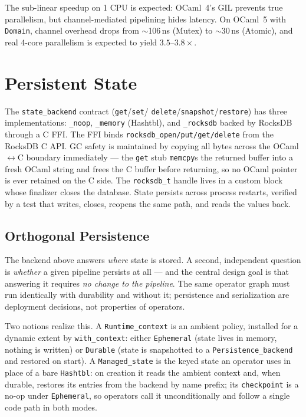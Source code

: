 \documentclass[11pt,a4paper]{article}
\begin{document}
The sub-linear speedup on 1 CPU is expected: OCaml~4's GIL prevents
true parallelism, but channel-mediated pipelining hides latency.
On OCaml~5 with \texttt{Domain}, channel overhead drops from
$\sim$106\,ns (Mutex) to $\sim$30\,ns (Atomic), and real
4-core parallelism is expected to yield $3.5$--$3.8\times$.

\section{Persistent State}

The \texttt{state\_backend} contract (\texttt{get}/\texttt{set}/%
\texttt{delete}/\texttt{snapshot}/\texttt{restore}) has three
implementations: \texttt{\_noop}, \texttt{\_memory} (Hashtbl), and
\texttt{\_rocksdb} backed by RocksDB through a C FFI. The FFI binds
\texttt{rocksdb\_open/put/get/delete} from the RocksDB C API. GC
safety is maintained by copying all bytes across the OCaml$\leftrightarrow$C
boundary immediately — the \texttt{get} stub \texttt{memcpy}s the
returned buffer into a fresh OCaml string and frees the C buffer before
returning, so no OCaml pointer is ever retained on the C side. The
\texttt{rocksdb\_t} handle lives in a custom block whose finalizer
closes the database. State persists across process restarts, verified
by a test that writes, closes, reopens the same path, and reads the
values back.

\subsection{Orthogonal Persistence}

The backend above answers \emph{where} state is stored. A second,
independent question is \emph{whether} a given pipeline persists at
all --- and the central design goal is that answering it requires
\emph{no change to the pipeline}. The same operator graph must run
identically with durability and without it; persistence and
serialization are deployment decisions, not properties of operators.

Two notions realize this. A \texttt{Runtime\_context} is an ambient
policy, installed for a dynamic extent by \texttt{with\_context}:
either \texttt{Ephemeral} (state lives in memory, nothing is written)
or \texttt{Durable} (state is snapshotted to a
\texttt{Persistence\_backend} and restored on start). A
\texttt{Managed\_state} is the keyed state an operator uses in place
of a bare \texttt{Hashtbl}: on creation it reads the ambient context
and, when durable, restores its entries from the backend by name
prefix; its \texttt{checkpoint} is a no-op under \texttt{Ephemeral},
so operators call it unconditionally and follow a single code path in
both modes.
\end{document}
